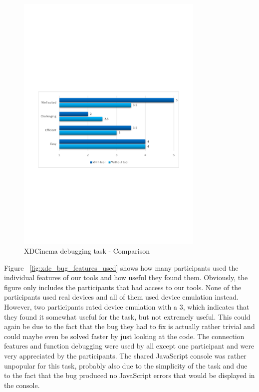 \begin{figure}[H]
  \centering
    \includegraphics[width=0.8\textwidth]{images/charts/xdc_bug_comparison.pdf}
	\caption{XDCinema debugging task - Comparison}
	\label{fig:xdc_bug_comparison}
\end{figure}

Figure ~\ref{fig:xdc_bug_features_used} shows how many participants used the individual features of our tools and how useful they found them. Obviously, the figure only includes the participants that had access to our tools. None of the participants used real devices and all of them used device emulation instead. However, two participants rated device emulation with a 3, which indicates that they found it somewhat useful for the task, but not extremely useful. This could again be due to the fact that the bug they had to fix is actually rather trivial and could maybe even be solved faster by just looking at the code. The connection features and function debugging were used by all except one participant and were very appreciated by the participants. The shared JavaScript console was rather unpopular for this task, probably also due to the simplicity of the task and due to the fact that the bug produced no JavaScript errors that would be displayed in the console.

